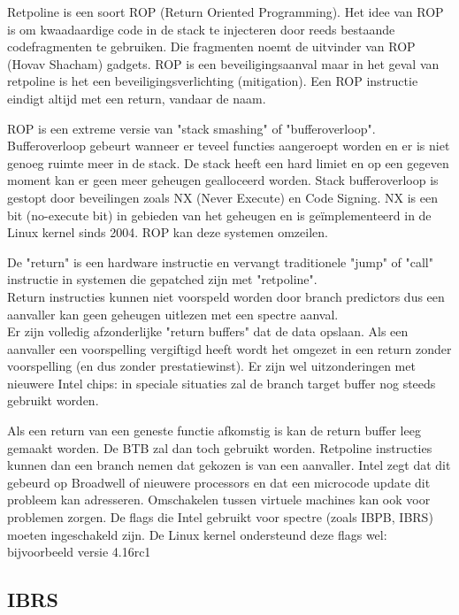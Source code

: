 Retpoline is een soort ROP (Return Oriented Programming).\newline
Het idee van ROP  is om kwaadaardige code in de stack te injecteren door reeds bestaande codefragmenten te gebruiken.
Die fragmenten noemt de uitvinder van ROP (Hovav Shacham) gadgets. \parencite{Shacham2007}
ROP is een beveiligingsaanval maar in het geval van retpoline is het een beveiligingsverlichting (mitigation).
Een ROP instructie eindigt altijd met een return, vandaar de naam.


ROP is een extreme versie van "stack smashing" of "bufferoverloop".\\
Bufferoverloop gebeurt wanneer er teveel functies aangeroept worden en er is niet genoeg ruimte meer in de stack. De stack heeft een hard limiet en op een gegeven moment kan er geen meer geheugen gealloceerd worden.
Stack bufferoverloop is gestopt door beveilingen zoals NX (Never Execute) en Code Signing.
NX is een bit (no-execute bit) in gebieden van het geheugen en is geïmplementeerd in de Linux kernel sinds 2004.\parencite{KernelNewbies2004}
ROP kan deze systemen omzeilen.

 
De "return" is een hardware instructie en vervangt traditionele "jump" of "call" instructie in systemen die gepatched zijn met "retpoline".\\ Return instructies kunnen niet voorspeld worden door branch predictors dus een aanvaller kan geen geheugen uitlezen met een spectre aanval.\\
Er zijn volledig afzonderlijke "return buffers" dat de data opslaan. Als een aanvaller een voorspelling vergiftigd heeft wordt het omgezet in een return zonder voorspelling (en dus zonder prestatiewinst). Er zijn wel uitzonderingen met nieuwere Intel chips: in speciale situaties zal de branch target buffer nog steeds gebruikt worden.


Als een return van een geneste functie afkomstig is kan de return buffer leeg gemaakt worden. De BTB zal dan toch gebruikt worden. Retpoline instructies kunnen dan een branch nemen dat gekozen is van een aanvaller. Intel zegt dat dit gebeurd op Broadwell of nieuwere processors en dat een microcode update dit probleem kan adresseren.
Omschakelen tussen virtuele machines kan ook voor problemen zorgen. De flags die Intel gebruikt voor spectre (zoals IBPB, IBRS) moeten ingeschakeld zijn. De Linux kernel ondersteund deze flags wel: bijvoorbeeld versie 4.16rc1

\subsection{IBRS}


